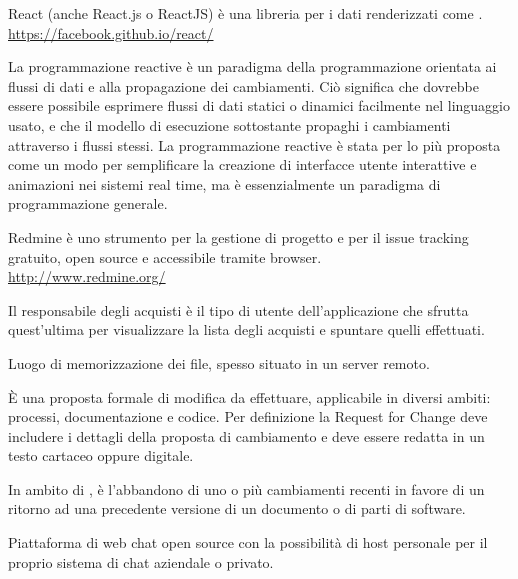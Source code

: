 React (anche React.js o ReactJS) è una libreria   per i dati renderizzati come .\\
\url{https://facebook.github.io/react/}

La programmazione reactive è un paradigma della programmazione orientata ai flussi di dati e alla propagazione dei cambiamenti. Ciò significa che dovrebbe essere possibile esprimere flussi di dati statici o dinamici facilmente nel linguaggio usato, e che il modello di esecuzione sottostante propaghi i cambiamenti attraverso i flussi stessi. La programmazione reactive è stata per lo più proposta come un modo per semplificare la creazione di interfacce utente interattive e animazioni nei sistemi real time, ma è essenzialmente un paradigma di programmazione generale.

Redmine è uno strumento per la gestione di progetto e per il issue tracking gratuito, open source e accessibile tramite browser.\\ 
\url{http://www.redmine.org/}

Il responsabile degli acquisti è il tipo di utente dell’applicazione che sfrutta quest’ultima per visualizzare la lista degli acquisti e spuntare quelli effettuati.

Luogo di memorizzazione dei file, spesso situato in un server remoto.

È una proposta formale di modifica da effettuare, applicabile in diversi ambiti: processi, documentazione e codice. Per definizione la Request for Change deve includere i dettagli della proposta di cambiamento e deve essere redatta in un testo cartaceo oppure digitale. 

In ambito di , è l'abbandono di uno o più cambiamenti recenti in favore di un ritorno ad una precedente versione di un documento o di parti di software.

Piattaforma di web chat open source con la possibilità di host personale per il proprio sistema di chat aziendale o privato. 
\clearpage
